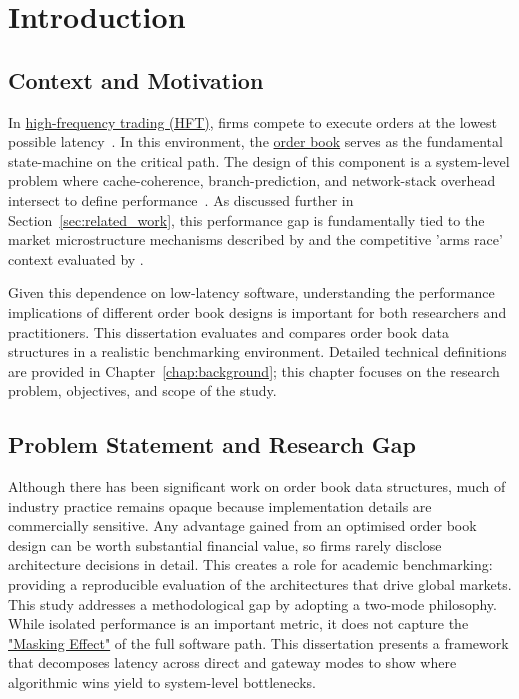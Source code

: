 \chapter{Introduction}
\label{chap:introduction}

\section{Context and Motivation}
In \hyperref[app:glossary]{high-frequency trading (HFT)}, firms compete to execute orders at the 
lowest possible latency~\citep{aldridge2013hft,bilokon2023cpp}. 
In this environment, the \hyperref[app:glossary]{order book} serves as the fundamental 
state-machine on the critical path. 
The design of this component is a system-level problem where cache-coherence, 
branch-prediction, and network-stack overhead intersect to define 
performance~\citep{bilokon2023cpp,thompson2011disruptor}. As discussed further 
in Section~\ref{sec:related_work}, this performance gap is fundamentally 
tied to the market microstructure mechanisms described by \citet{ohara1995market} 
and the competitive 'arms race' context evaluated by \citet{aquilina2022armsrace}.

Given this dependence on low-latency software, understanding the performance 
implications of different order book designs is important for both researchers 
and practitioners. 
This dissertation evaluates and compares order book data 
structures in a realistic benchmarking environment. 
Detailed technical definitions are provided in Chapter~\ref{chap:background}; 
this chapter focuses on the research problem, objectives, and scope of the study.

\section{Problem Statement and Research Gap}
Although there has been significant work on order book data structures, much of
industry practice remains opaque because implementation details are commercially
sensitive. Any advantage gained from an optimised order book design can be worth 
substantial financial value, so firms rarely disclose architecture decisions in 
detail. 
This creates a role for academic benchmarking: providing a 
reproducible evaluation of the architectures that drive global markets. 
This study addresses a methodological gap by adopting a 
two-mode philosophy. 
While isolated performance is an important metric, it does not capture the 
\hyperref[app:glossary]{"Masking Effect"} of the full software path. 
This dissertation presents a framework that decomposes latency across 
direct and gateway modes to show where algorithmic wins yield to 
system-level bottlenecks.

